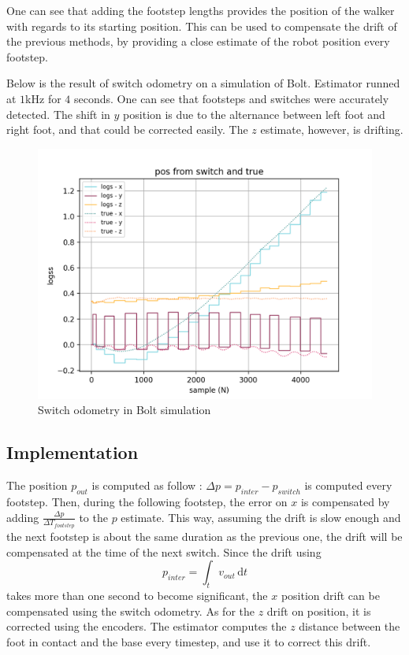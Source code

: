 \documentclass[a4paper,10pt]{article}
\begin{document}
One can see that adding the footstep lengths provides the position of the walker with regards to its starting position. This can be used to compensate the drift of the previous methods, by providing a close estimate of the robot position every footstep.


Below is the result of switch odometry on a simulation of Bolt. Estimator runned at $1$kHz for $4$ seconds. One can see that footsteps and switches were accurately detected. The shift in $y$ position is due to the alternance between left foot and right foot, and that could be corrected easily. The $z$ estimate, however, is drifting.



\begin{figure}[H]
\centering
  \includegraphics[width=\linewidth, angle=0, scale=0.7]{./images/switch_odometry.png}
  \caption{Switch odometry in Bolt simulation}
\end{figure}

\subsection{Implementation}

The position $p_{out}$ is computed as follow : $\Delta p = p_{inter} - p_{switch}$ is computed every footstep. Then, during the following footstep, the error on $x$ is compensated by adding $\frac{\Delta p}{\Delta T_{footstep}}$ to the $p$ estimate. This way, assuming the drift is slow enough and the next footstep is about the same duration as the previous one, the drift will be compensated at the time of the next switch. Since the drift using 
$$ p_{inter} = \int_t v_{out} \, \mathrm{d}t $$
takes more than one second to become significant, the $x$ position drift can be compensated using the switch odometry.
As for the $z$ drift on position, it is corrected using the encoders. The estimator computes the $z$ distance between the foot in contact and the base every timestep, and use it to correct this drift.
\end{document}
